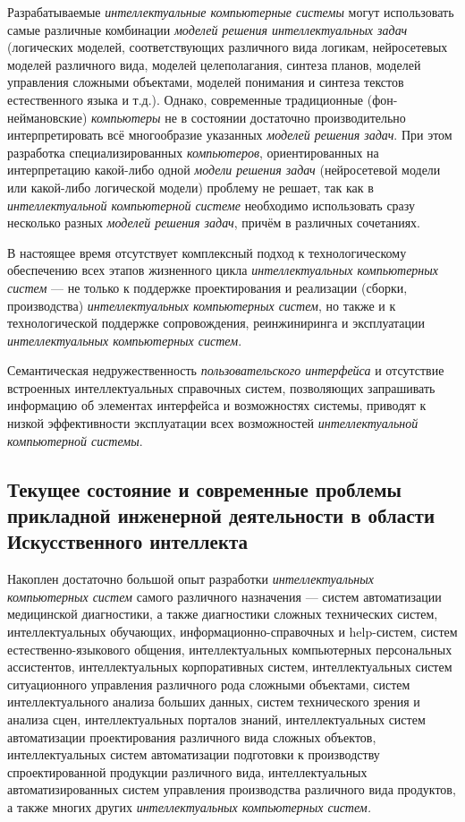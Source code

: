 Разрабатываемые \textit{интеллектуальные компьютерные системы} могут использовать самые различные комбинации \textit{моделей решения интеллектуальных задач} (логических моделей, соответствующих различного вида логикам, нейросетевых моделей различного вида, моделей целеполагания, синтеза планов, моделей управления сложными объектами, моделей понимания и синтеза текстов естественного языка и т.д.). Однако, современные традиционные (фон-неймановские) \textit{компьютеры} не в состоянии достаточно производительно интерпретировать всё многообразие указанных \textit{моделей решения задач}. При этом разработка специализированных \textit{компьютеров}, ориентированных на интерпретацию какой-либо одной \textit{модели решения задач} (нейросетевой модели или какой-либо логической модели) проблему не решает, так как в \textit{интеллектуальной компьютерной системе} необходимо использовать сразу несколько разных \textit{моделей решения задач}, причём в различных сочетаниях.

В настоящее время отсутствует комплексный подход к технологическому обеспечению всех этапов жизненного цикла \textit{интеллектуальных компьютерных систем} --- не только к поддержке проектирования и реализации (сборки, производства) \textit{интеллектуальных компьютерных систем}, но также и к технологической поддержке сопровождения, реинжиниринга и эксплуатации \textit{интеллектуальных компьютерных систем}.

Семантическая недружественность \textit{пользовательского интерфейса} и отсутствие встроенных интеллектуальных справочных систем, позволяющих запрашивать информацию об элементах интерфейса и возможностях системы, приводят к низкой эффективности эксплуатации всех возможностей \textit{интеллектуальной компьютерной системы}.

\subsection{Текущее состояние и современные проблемы прикладной инженерной деятельности в области Искусственного интеллекта}
\label{subsec_current_state_and_modern_problems_applied_engineering_activity}

Накоплен достаточно большой опыт разработки \textit{интеллектуальных компьютерных систем} самого различного назначения --- систем автоматизации медицинской диагностики, а также диагностики сложных технических систем, интеллектуальных обучающих, информационно-справочных и help-систем, систем естественно-языкового общения, интеллектуальных компьютерных персональных ассистентов, интеллектуальных корпоративных систем, интеллектуальных систем ситуационного управления различного рода сложными объектами, систем интеллектуального анализа больших данных, систем технического зрения и анализа сцен, интеллектуальных порталов знаний, интеллектуальных систем автоматизации проектирования различного вида сложных объектов, интеллектуальных систем автоматизации подготовки к производству спроектированной продукции различного вида, интеллектуальных автоматизированных систем управления производства различного вида продуктов, а также многих других \textit{интеллектуальных компьютерных систем.}

